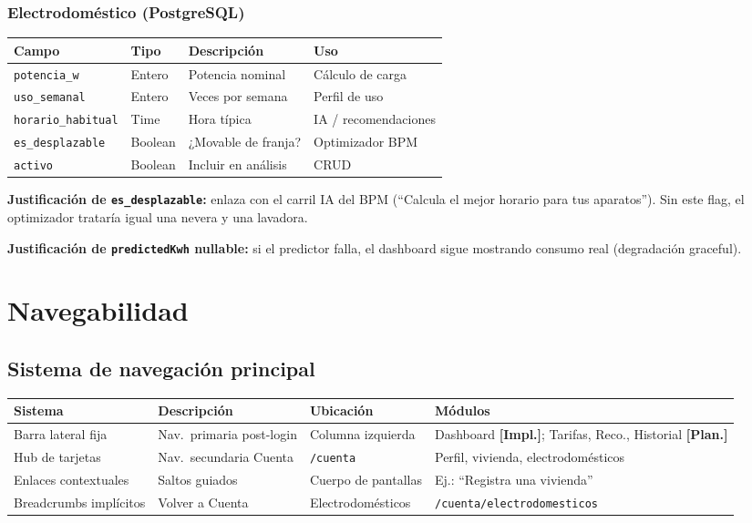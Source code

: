 \documentclass[11pt,a4paper]{article}
\newcommand{\stimpl}{\textcolor{impl}{\textbf{[Impl.]}}}
\newcommand{\stplan}{\textcolor{plan}{\textbf{[Plan.]}}}
\begin{document}
\subsubsection{Electrodoméstico (PostgreSQL)}

\begin{table}[H]
\centering
\scriptsize
\begin{tabularx}{\textwidth}{@{}L{2.6cm}L{1.8cm}L{4.8cm}Y@{}}
\toprule
\textbf{Campo} & \textbf{Tipo} & \textbf{Descripción} & \textbf{Uso} \\
\midrule
\texttt{potencia\_w} & Entero & Potencia nominal & Cálculo de carga \\
\texttt{uso\_semanal} & Entero & Veces por semana & Perfil de uso \\
\texttt{horario\_habitual} & Time & Hora típica & IA / recomendaciones \\
\texttt{es\_desplazable} & Boolean & ¿Movable de franja? & Optimizador BPM \\
\texttt{activo} & Boolean & Incluir en análisis & CRUD \\
\bottomrule
\end{tabularx}
\end{table}

\textbf{Justificación de \texttt{es\_desplazable}:} enlaza con el carril IA del BPM (``Calcula el mejor horario para tus aparatos''). Sin este flag, el optimizador trataría igual una nevera y una lavadora.

\textbf{Justificación de \texttt{predictedKwh} nullable:} si el predictor falla, el dashboard sigue mostrando consumo real (degradación graceful).

\section{Navegabilidad}

\subsection{Sistema de navegación principal}

\begin{table}[H]
\centering
\small
\begin{tabularx}{\textwidth}{@{}L{2.6cm}L{4.2cm}L{2.8cm}Y@{}}
\toprule
\textbf{Sistema} & \textbf{Descripción} & \textbf{Ubicación} & \textbf{Módulos} \\
\midrule
Barra lateral fija & Nav.\ primaria post-login & Columna izquierda & Dashboard \stimpl; Tarifas, Reco., Historial \stplan \\
Hub de tarjetas & Nav.\ secundaria Cuenta & \texttt{/cuenta} & Perfil, vivienda, electrodomésticos \\
Enlaces contextuales & Saltos guiados & Cuerpo de pantallas & Ej.: ``Registra una vivienda'' \\
Breadcrumbs implícitos & Volver a Cuenta & Electrodomésticos & \texttt{/cuenta/electrodomesticos} \\
\bottomrule
\end{tabularx}
\end{table}
\end{document}
